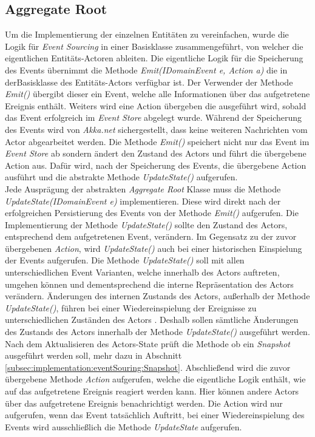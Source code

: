 \subsection{Aggregate Root}
Um die Implementierung der einzelnen Entitäten zu vereinfachen, wurde die Logik für \textit{Event Sourcing} in einer Basisklasse zusammengeführt, von welcher die eigentlichen Entitäts-Actoren ableiten. 
Die eigentliche Logik für die Speicherung des Events übernimmt die Methode \textit{Emit(IDomainEvent e, Action a)} die in derBasisklasse des Entitäts-Actors verfügbar ist. Der Verwender der Methode \textit{Emit()} übergibt dieser ein Event, welche alle Informationen über das aufgetretene Ereignis enthält. Weiters wird eine Action übergeben die ausgeführt wird, sobald das Event erfolgreich im \textit{Event Store} abgelegt wurde. Während der Speicherung des Events wird von \textit{Akka.net} sichergestellt, dass keine weiteren Nachrichten vom Actor abgearbeitet werden. Die Methode \textit{Emit()} speichert nicht nur das Event im \textit{Event Store} ab sondern ändert den Zustand des Actors und führt die übergebene Action aus. Dafür wird, nach der Speicherung des Events, die übergebene Action ausführt und die abstrakte Methode \textit{UpdateState()} aufgerufen. \\
Jede Ausprägung der abstrakten \textit{Aggregate Root} Klasse muss die Methode \textit{UpdateState(IDomainEvent e)} implementieren. Diese wird direkt nach der erfolgreichen Persistierung des Events von der Methode \textit{Emit()} aufgerufen. Die Implementierung der Methode \textit{UpdateState()} sollte den Zustand des Actors, entsprechend dem aufgetretenen Event, verändern. Im Gegensatz zu der zuvor übergebenen \textit{Action}, wird \textit{UpdateState()} auch bei einer historischen Einspielung der Events aufgerufen. Die Methode \textit{UpdateState()} soll mit allen unterschiedlichen Event Varianten, welche innerhalb des Actors auftreten, umgehen können und dementsprechend die interne Repräsentation des Actors verändern. Änderungen des internen Zustands des Actors, außerhalb der Methode \textit{UpdateState()}, führen bei einer Wiedereinspielung der Ereignisse zu unterschiedlichen Zuständen des Actors . Deshalb sollen sämtliche Änderungen des Zustands des Actors innerhalb der Methode \textit{UpdateState()} ausgeführt werden. \\
Nach dem Aktualisieren des Actors-State prüft die Methode ob ein \textit{Snapshot} ausgeführt werden soll, mehr dazu in Abschnitt \ref{subsec:implementation:eventSouring:Snapshot}. Abschließend wird die zuvor übergebene Methode \textit{Action} aufgerufen, welche die eigentliche Logik enthält, wie auf das aufgetretene Ereignis reagiert werden kann. Hier können andere Actors über das aufgetretene Ereignis benachrichtigt werden. Die Action wird nur aufgerufen, wenn das Event tatsächlich Auftritt, bei einer Wiedereinspielung des Events wird ausschließlich die Methode \textit{UpdateState} aufgerufen. \\ 

